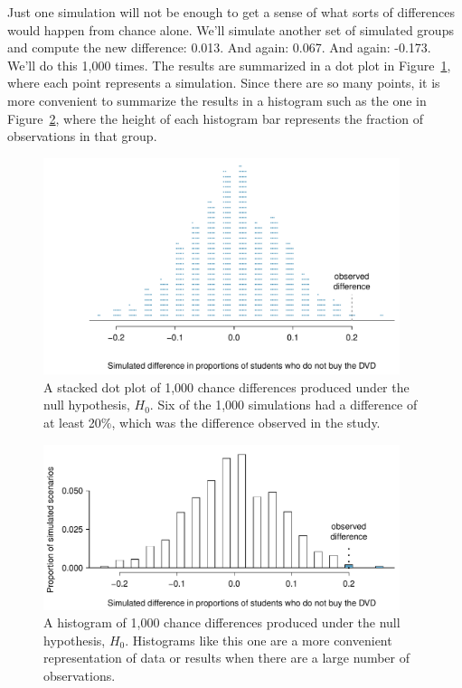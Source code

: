 Just one simulation will not be enough to get a sense of what sorts of differences would happen from chance alone. We'll simulate another set of simulated groups and compute the new difference: 0.013. And again: 0.067. And again: -0.173. We'll do this 1,000 times. The results are summarized in a dot plot in Figure~\ref{OpportunityCostDiffsDotPlot}, where each point represents a simulation. Since there are so many points, it is more convenient to summarize the results in a histogram such as the one in Figure~\ref{OpportunityCostDiffs}, where the height of each histogram bar represents the fraction of observations in that group.

\begin{figure}[p]
\centering
\includegraphics[width=0.93\textwidth]{02/figures/OpportunityCost/OpportunityCostDiffsDotPlot}
\caption{A stacked dot plot of 1,000 chance differences produced under the null hypothesis, $H_0$. Six of the 1,000 simulations had a difference of at least 20\%, which was the difference observed in the study.}
\label{OpportunityCostDiffsDotPlot}
\end{figure}

\begin{figure}[p]
\centering
\includegraphics[width=0.93\textwidth]{02/figures/OpportunityCost/OpportunityCostDiffsRightTail}
\caption{A histogram of 1,000 chance differences produced under the null hypothesis, $H_0$. Histograms like this one are a more convenient representation of data or results when there are a large number of observations.}
\label{OpportunityCostDiffs}
\end{figure}

